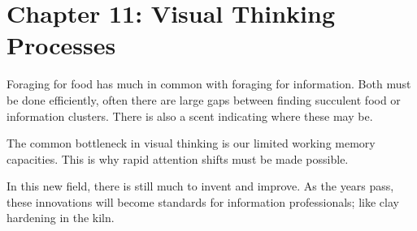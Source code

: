 \section{Chapter 11: Visual Thinking Processes}
\graphicspath{ {pngs/ch11/} }


\secttoc

Foraging for food has much in common with foraging for information.
Both must be done efficiently, often there are large gaps between finding
succulent food or information clusters. There is also a scent indicating where
these may be.

The common bottleneck in visual thinking is our limited working memory
capacities. This is why rapid attention shifts must be made possible.

In this new field, there is still much to invent and improve. As the years
pass, these innovations will become standards for information
professionals; like clay hardening in the kiln.

